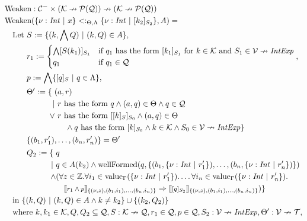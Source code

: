 \documentclass[]{scrbook}
\newcommand{\semantic}[1]{\llbracket \text{\footnotesize\texttt{#1}} \rrbracket}
\theoremstyle{definition}
\theoremstyle{definition}
\theoremstyle{definition}
\theoremstyle{remark}
\begin{document}
\[
\begin{aligned}
&\text{Weaken}:\mathcal{C}^-\times(\mathcal{K}\nrightarrow\mathcal{P}(\mathcal{Q}))\nrightarrow(\mathcal{K}\nrightarrow\mathcal{P}(\mathcal{Q}))\\
&\text{Weaken}(\{\nu:\mathit{Int}\ |\ x \} <:_{\Theta,\Lambda} \{\nu:\mathit{Int}\ |\ [k_2]_{S_2}\},A) =\\
&\quad\begin{aligned}\text{Let }&S:=\{(k,\bigwedge Q) \ | \ (k,Q)\in A\},\\
&r_1 := \begin{cases}\bigwedge [S(k_1)]_{S_1}&\text{if } q_1 \text{ has the form } [k_1]_{S_1} \text{ for } k\in\mathcal{K}\text{ and } S_1\in\mathcal{V}\nrightarrow\mathit{IntExp}\\
q_1& \text{if }q_1\in\mathcal{Q}
\end{cases},\\
&p:=\bigwedge\{[q]_S\ |\ q\in\Lambda \},\\
&\begin{aligned} \Theta':= \{\ (&a,r)\\
   | \ &r \text{ has the form } q \land (a,q)\in\Theta \land q\in\mathcal{Q}\\
\lor \ &r \text{ has the form } [[k]_S]_{S_0}\land (a,q)\in\Theta\\
&\quad\land q \text{ has the form }[k]_{S_0} \land k\in\mathcal{K} \land S_0\in\mathcal{V}\nrightarrow\mathit{IntExp}\}
\end{aligned}\\
&\{(b_1,r_1'),\dots,(b_n,r_n')\}=\Theta'\\
&\begin{aligned}Q_2 := \{\ &q \\
| \ &q\in A(k_2)\land \text{wellFormed}(q,\{(b_1,\{\nu:\mathit{Int}\ |\ r_1'\}),\dots,(b_n,\{\nu:\mathit{Int}\ |\ r_n'\})\})\\
\land & (\forall z \in \mathbb{Z}.\forall i_1\in\text{value}_\Gamma(\{\nu:\mathit{Int}\ |\ r_1'\}).\dots \forall i_n\in\text{value}_\Gamma(\{\nu:\mathit{Int}\ |\ r_n'\}).\\
&\quad\semantic{$r_1\land p$}_{\{(\nu,z),(b_1,i_1),\dots,(b_n,i_n)\}}\Rightarrow\semantic{$[q]_{S_2}$}_{\{(\nu,z),(b_1,i_1),\dots,(b_n,i_n)\}})\}
\end{aligned}\end{aligned}\\
&\quad\text{in }\{(k,Q)\ |\ (k,Q)\in A \land k \neq k_2\}\cup\{(k_2,Q_2)\}\\
&\quad\text{where } k,k_1\in\mathcal{K},Q,Q_2\subseteq\mathcal{Q},S:\mathcal{K}\nrightarrow\mathcal{Q},r_1\in\mathcal{Q},p\in\mathcal{Q},S_2:\mathcal{V}\nrightarrow\mathit{IntExp},\Theta':\mathcal{V}\nrightarrow\mathcal{T},\\

\end{aligned}\]
\end{document}
